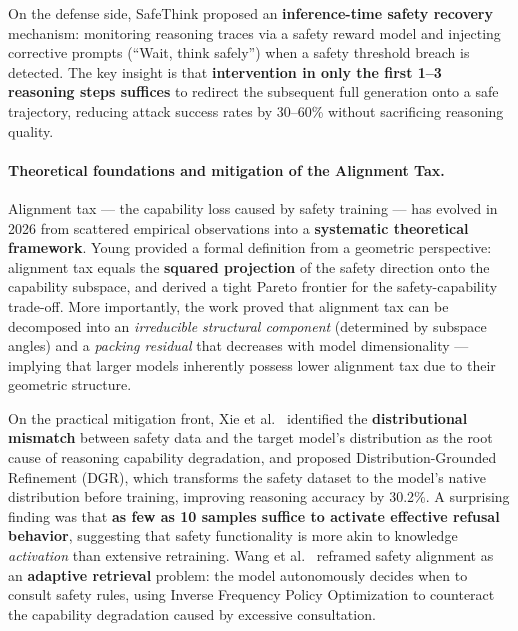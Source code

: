 On the defense side, SafeThink \cite{ghosal2026safethink}
proposed an \textbf{inference-time safety recovery} mechanism:
monitoring reasoning traces via a safety reward model
and injecting corrective prompts (``Wait, think safely'') when a safety threshold breach is detected.
The key insight is that \textbf{intervention in only the first 1--3 reasoning steps suffices}
to redirect the subsequent full generation onto a safe trajectory,
reducing attack success rates by 30--60\% without sacrificing reasoning quality.

\paragraph{Theoretical foundations and mitigation of the Alignment Tax.}
Alignment tax --- the capability loss caused by safety training ---
has evolved in 2026 from scattered empirical observations into a \textbf{systematic theoretical framework}.
Young \cite{young2026alignmenttax} provided a formal definition from a geometric perspective:
alignment tax equals the \textbf{squared projection} of the safety direction onto the capability subspace,
and derived a tight Pareto frontier for the safety-capability trade-off.
More importantly, the work proved that alignment tax can be decomposed into
an \emph{irreducible structural component} (determined by subspace angles) and
a \emph{packing residual} that decreases with model dimensionality ---
implying that larger models inherently possess lower alignment tax due to their geometric structure.

On the practical mitigation front,
Xie et al.\ \cite{xie2026dgr} identified the
\textbf{distributional mismatch} between safety data and the target model's distribution
as the root cause of reasoning capability degradation,
and proposed Distribution-Grounded Refinement (DGR),
which transforms the safety dataset to the model's native distribution before training,
improving reasoning accuracy by 30.2\%.
A surprising finding was that
\textbf{as few as 10 samples suffice to activate effective refusal behavior},
suggesting that safety functionality is more akin to knowledge \emph{activation} than extensive retraining.
Wang et al.\ \cite{wang2026ascl} reframed safety alignment as an
\textbf{adaptive retrieval} problem:
the model autonomously decides when to consult safety rules,
using Inverse Frequency Policy Optimization to counteract the capability degradation caused by excessive consultation.

